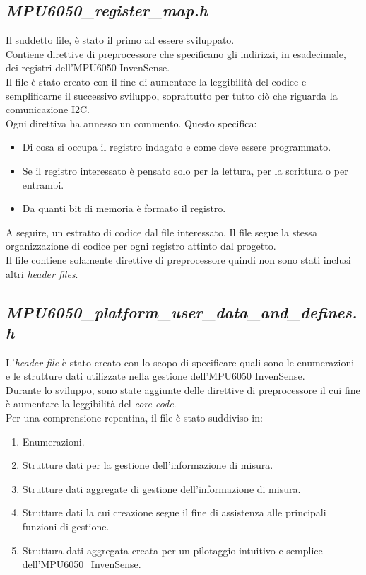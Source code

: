 \documentclass[11pt]{report}
\begin{document}
\subsection{\textit{MPU6050\_register\_map.h}}
Il suddetto file, è stato il primo ad essere sviluppato.\\
Contiene direttive di preprocessore che specificano gli indirizzi, in esadecimale, dei registri dell'MPU6050 InvenSense.\\
Il file è stato creato con il fine di aumentare la leggibilità del codice e semplificarne il successivo sviluppo, soprattutto per tutto ciò che riguarda la comunicazione I2C.\\
Ogni direttiva ha annesso un commento. Questo specifica:
\begin{itemize}
\item Di cosa si occupa il registro indagato e come deve essere programmato.
\item Se il registro interessato è pensato solo per la lettura, per la scrittura o per entrambi.
\item Da quanti bit di memoria è formato il registro.
\end{itemize}
A seguire, un estratto di codice dal file interessato. Il file segue la stessa organizzazione di codice per ogni registro attinto dal progetto.\\

Il file contiene solamente direttive di preprocessore quindi non sono stati inclusi altri \textit{header files}.

\subsection{\textit{MPU6050\_platform\_user\_data\_and\_defines.h}}
L'\textit{header file} è stato creato con lo scopo di specificare quali sono le enumerazioni e le strutture dati utilizzate nella gestione dell'MPU6050 InvenSense.\\
Durante lo sviluppo, sono state aggiunte delle direttive di preprocessore il cui fine è aumentare la leggibilità del \textit{core code}.\\
Per una comprensione repentina, il file è stato suddiviso in:
\begin{enumerate}
    \item Enumerazioni.
    \item Strutture dati per la gestione dell'informazione di misura.
    \item Strutture dati aggregate di gestione dell'informazione di misura.
    \item Strutture dati la cui creazione segue il fine di assistenza alle principali funzioni di gestione.
    \item Struttura dati aggregata creata per un pilotaggio intuitivo e semplice\\dell'MPU6050\_InvenSense.
\end{enumerate}
\end{document}
